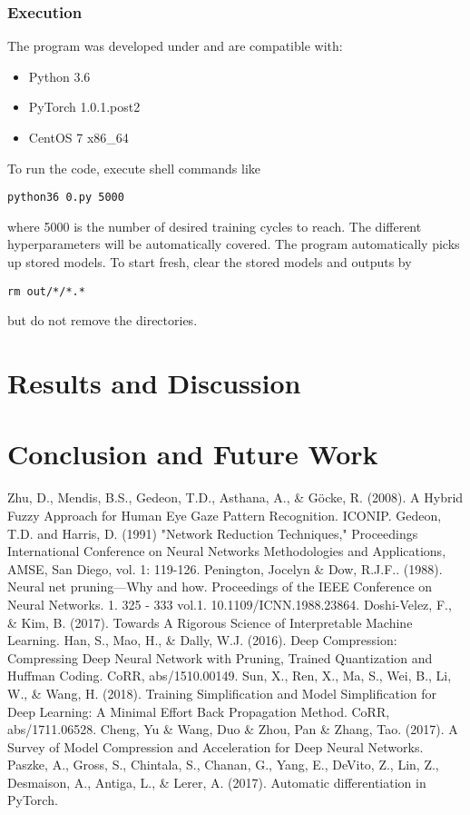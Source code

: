\documentclass[runningheads]{llncs}
\begin{document}
\subsubsection{Execution}

The program was developed under and are compatible with:
\begin{itemize}
\item Python 3.6
\item PyTorch 1.0.1.post2
\item CentOS 7 x86\_64
\end{itemize}
To run the code, execute shell commands like
\begin{verbatim}
python36 0.py 5000
\end{verbatim}
where 5000 is the number of desired training cycles to reach.
The different hyperparameters will be automatically covered.
The program automatically picks up stored models.
To start fresh, clear the stored models and outputs by
\begin{verbatim}
rm out/*/*.*
\end{verbatim}
but do not remove the directories.


\section{Results and Discussion}

\section{Conclusion and Future Work}

\begin{thebibliography}{8}
Zhu, D., Mendis, B.S., Gedeon, T.D., Asthana, A., \& Göcke, R. (2008). A Hybrid Fuzzy Approach for Human Eye Gaze Pattern Recognition. ICONIP.
Gedeon, T.D. and Harris, D. (1991) "Network Reduction Techniques," Proceedings International Conference on Neural Networks Methodologies and Applications, AMSE, San Diego, vol. 1: 119-126. 
Penington, Jocelyn \& Dow, R.J.F.. (1988). Neural net pruning—Why and how. Proceedings of the IEEE Conference on Neural Networks. 1. 325 - 333 vol.1. 10.1109/ICNN.1988.23864. 
Doshi-Velez, F., \& Kim, B. (2017). Towards A Rigorous Science of Interpretable Machine Learning.
Han, S., Mao, H., \& Dally, W.J. (2016). Deep Compression: Compressing Deep Neural Network with Pruning, Trained Quantization and Huffman Coding. CoRR, abs/1510.00149.
Sun, X., Ren, X., Ma, S., Wei, B., Li, W., \& Wang, H. (2018). Training Simplification and Model Simplification for Deep Learning: A Minimal Effort Back Propagation Method. CoRR, abs/1711.06528.
Cheng, Yu \& Wang, Duo \& Zhou, Pan \& Zhang, Tao. (2017). A Survey of Model Compression and Acceleration for Deep Neural Networks. 
Paszke, A., Gross, S., Chintala, S., Chanan, G., Yang, E., DeVito, Z., Lin, Z., Desmaison, A., Antiga, L., \& Lerer, A. (2017). Automatic differentiation in PyTorch.
\end{thebibliography}
\end{document}
